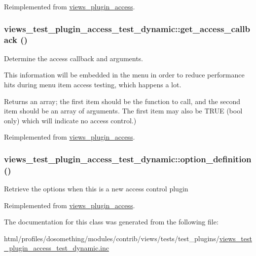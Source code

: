 Reimplemented from \hyperlink{classviews__plugin__access_ad24d38c1b1a1bd7527b2b96a2103cede}{views\_\-plugin\_\-access}.\hypertarget{classviews__test__plugin__access__test__dynamic_ac4efa2ff862eb1592afd64b76ebfed1d}{
\subsubsection[{get\_\-access\_\-callback}]{\setlength{\rightskip}{0pt plus 5cm}views\_\-test\_\-plugin\_\-access\_\-test\_\-dynamic::get\_\-access\_\-callback ()}}
\label{classviews__test__plugin__access__test__dynamic_ac4efa2ff862eb1592afd64b76ebfed1d}
Determine the access callback and arguments.

This information will be embedded in the menu in order to reduce performance hits during menu item access testing, which happens a lot.

\begin{DoxyReturn}{Returns}
an array; the first item should be the function to call, and the second item should be an array of arguments. The first item may also be TRUE (bool only) which will indicate no access control.) 
\end{DoxyReturn}


Reimplemented from \hyperlink{classviews__plugin__access_ad4038a32fccc6a662a74f437d0bf6a23}{views\_\-plugin\_\-access}.\hypertarget{classviews__test__plugin__access__test__dynamic_a93811dcacbb91508644cf989d53ca5cb}{
\subsubsection[{option\_\-definition}]{\setlength{\rightskip}{0pt plus 5cm}views\_\-test\_\-plugin\_\-access\_\-test\_\-dynamic::option\_\-definition ()}}
\label{classviews__test__plugin__access__test__dynamic_a93811dcacbb91508644cf989d53ca5cb}
Retrieve the options when this is a new access control plugin 

Reimplemented from \hyperlink{classviews__plugin__access_a3d52dc2603a2991a46a3c212a04097d2}{views\_\-plugin\_\-access}.

The documentation for this class was generated from the following file:\begin{DoxyCompactItemize}
\item 
html/profiles/dosomething/modules/contrib/views/tests/test\_\-plugins/\hyperlink{views__test__plugin__access__test__dynamic_8inc}{views\_\-test\_\-plugin\_\-access\_\-test\_\-dynamic.inc}\end{DoxyCompactItemize}
